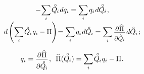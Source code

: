 \begin{otherlanguage}{russian}
\begin{equation*}
\begin{array}{c}
- \hspace{.1ex} \tikzmark{beginLegendreOfPotential} \scalebox{0.95}[1]{$\displaystyle \sum_{\smash{i}}$} \hspace{.2ex} \mathcircabove{Q}_{\hspace{-0.1ex}i} \hspace{.2ex} dq_i \tikzmark{endLegendreOfPotential}
= \scalebox{0.95}[1]{$\displaystyle \sum_{\smash{i}}$} \hspace{.32ex} q_i \hspace{.2ex} d\mathcircabove{Q}_{\hspace{-0.1ex}i}
\hspace{.2ex} ,
\\[1em]
%
\small
d \hspace{-0.1ex} \left( \scalebox{0.95}[1]{$\displaystyle \sum_{\smash{i}}$} \hspace{.2ex} \mathcircabove{Q}_{\hspace{-0.1ex}i} \hspace{.2ex} q_i - \Pi \hspace{-0.1ex} \right) \hspace{-0.5ex}
= \scalebox{0.95}[1]{$\displaystyle \sum_{\smash{i}}$} \hspace{.32ex} q_i \hspace{.2ex} d\mathcircabove{Q}_{\hspace{-0.1ex}i}
= \scalebox{0.95}[1]{$\displaystyle \sum_{\smash{i}}$} \hspace{.4ex}
\scalebox{0.96}{$ \displaystyle \frac{\raisemath{-0.12em}{\partial \hspace{.1ex} \widehat{\Pi}}}{\raisemath{-0.4em}{\partial \mathcircabove{Q}_{\hspace{-0.1ex}i}}} $}
\hspace{.25ex} d\mathcircabove{Q}_{\hspace{-0.1ex}i}
%
\hspace{.33ex} ;
\end{array}\end{equation*}%

\nopagebreak\vspace{-0.33em}\begin{equation}\label{Castigliano:theorem}
q_i = \scalebox{0.96}{$ \displaystyle \frac{\raisemath{-0.12em}{\partial \hspace{.1ex} \widehat{\Pi}}}{\raisemath{-0.4em}{\partial \mathcircabove{Q}_{\hspace{-0.1ex}i}}} $} \hspace{.2ex} ,
\:\;
\widehat{\Pi}(\mathcircabove{Q}_{\hspace{-0.1ex}i})
= \scalebox{0.95}[1]{$\displaystyle \sum_{\smash{i}}$} \hspace{.2ex} \mathcircabove{Q}_{\hspace{-0.1ex}i} \hspace{.12ex} q_i - \Pi
\hspace{.1ex} .
\end{equation}


\end{otherlanguage}
